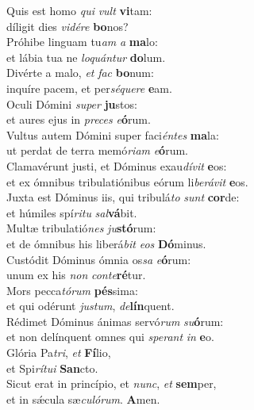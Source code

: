\evenverse Quis est homo \textit{qui} \textit{vult} \textbf{vi}tam:~\*\\
\evenverse díligit dies \textit{vi}\textit{dé}\textit{re} \textbf{bo}nos?\\
\oddverse Próhibe linguam tu\textit{am} \textit{a} \textbf{ma}lo:~\*\\
\oddverse et lábia tua ne \textit{lo}\textit{quán}\textit{tur} \textbf{do}lum.\\
\evenverse Divérte a malo, \textit{et} \textit{fac} \textbf{bo}num:~\*\\
\evenverse inquíre pacem, et per\textit{sé}\textit{que}\textit{re} \textbf{e}am.\\
\oddverse Oculi Dómini \textit{su}\textit{per} \textbf{ju}stos:~\*\\
\oddverse et aures ejus in \textit{pre}\textit{ces} \textit{e}\textbf{ó}rum.\\
\evenverse Vultus autem Dómini super faci\textit{én}\textit{tes} \textbf{ma}la:~\*\\
\evenverse ut perdat de terra memó\textit{ri}\textit{am} \textit{e}\textbf{ó}rum.\\
\oddverse Clamavérunt justi, et Dóminus exau\textit{dí}\textit{vit} \textbf{e}os:~\*\\
\oddverse et ex ómnibus tribulatiónibus eórum li\textit{be}\textit{rá}\textit{vit} \textbf{e}os.\\
\evenverse Juxta est Dóminus iis, qui tribulá\textit{to} \textit{sunt} \textbf{cor}de:~\*\\
\evenverse et húmiles spí\textit{ri}\textit{tu} \textit{sal}\textbf{vá}bit.\\
\oddverse Multæ tribulatió\textit{nes} \textit{ju}\textbf{stó}rum:~\*\\
\oddverse et de ómnibus his liberá\textit{bit} \textit{e}\textit{os} \textbf{Dó}minus.\\
\evenverse Custódit Dóminus ómnia os\textit{sa} \textit{e}\textbf{ó}rum:~\*\\
\evenverse unum ex his \textit{non} \textit{con}\textit{te}\textbf{ré}tur.\\
\oddverse Mors pecca\textit{tó}\textit{rum} \textbf{pés}sima:~\*\\
\oddverse et qui odérunt \textit{ju}\textit{stum}, \textit{de}\textbf{lín}quent.\\
\evenverse Rédimet Dóminus ánimas servó\textit{rum} \textit{su}\textbf{ó}rum:~\*\\
\evenverse et non delínquent omnes qui \textit{spe}\textit{rant} \textit{in} \textbf{e}o.\\
\oddverse Glória Pa\textit{tri}, \textit{et} \textbf{Fí}lio,~\*\\
\oddverse et Spi\textit{rí}\textit{tu}\textit{i} \textbf{San}cto.\\
\evenverse Sicut erat in princípio, et \textit{nunc}, \textit{et} \textbf{sem}per,~\*\\
\evenverse et in sǽcula sæ\textit{cu}\textit{ló}\textit{rum}. \textbf{A}men.\\
